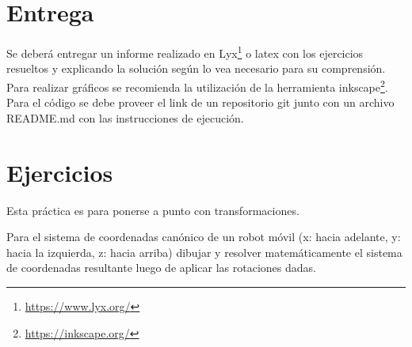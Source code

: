 \documentclass[tp]{lcc}
\begin{document}
\maketitle

\section{Entrega}
Se deberá entregar un informe realizado en Lyx\footnote{\url{https://www.lyx.org/}} o latex con los ejercicios resueltos y explicando la solución según lo vea necesario para su comprensión. Para realizar gráficos se recomienda la utilización de la herramienta inkscape\footnote{\url{https://inkscape.org/}}. Para el código se debe proveer el link de un repositorio git junto con un archivo README.md con las instrucciones de ejecución.

\section{Ejercicios}
Esta práctica es para ponerse a punto con transformaciones.

\ejercicio Para el sistema de coordenadas canónico de un robot móvil (x: hacia adelante, y: hacia la izquierda, z: hacia arriba) dibujar y resolver matemáticamente el sistema de coordenadas resultante luego de aplicar las rotaciones dadas.

    \begin{figure}[!h]
    \centering
    \hspace{-4cm}
    \hspace{3cm}
    \subfloat[$R_{y}(\SI{90}{\degree})$]
    {
        
    }
    \hspace{3cm}
    \hspace{3cm}
    \end{figure}
\end{document}
